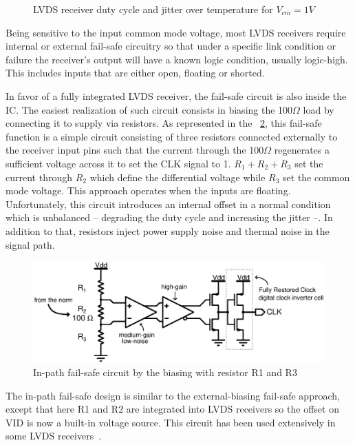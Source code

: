 \begin{figure}[htp]
\begin{subfigure}[b]{0.32\textwidth}
    \end{subfigure}
    \caption{LVDS receiver duty cycle and jitter over temperature for $V_{cm} = 1 V$}
    \label{fig:lvds-receiver-res1V}
\end{figure}

Being sensitive to the input common mode voltage, most LVDS receivers require internal or external fail-safe circuitry so that under a specific link condition or failure the receiver's output will have a known logic condition, usually logic-high. This includes inputs that are either open, floating or shorted.

In favor of a fully integrated LVDS receiver, the fail-safe circuit is also inside the IC\@. The easiest realization of such circuit consists in biasing the 100$\Omega$ load by connecting it to supply via resistors. As represented in the \figurename~\ref{fig:in-path-fail-safe}, this fail-safe function is a simple circuit consisting of three resistors connected externally to the receiver input pins such that the current through the 100$\Omega$ regenerates a sufficient voltage across it to set the CLK signal to 1. $R_1+R_2+R_3$ set the current through $R_2$ which define the differential voltage while $R_3$ set the common mode voltage. This approach operates when the inputs are floating. Unfortunately, this circuit introduces an internal offset in a normal condition which is unbalanced -- degrading the duty cycle and increasing the jitter --. In addition to that, resistors inject power supply noise and thermal noise in the signal path.

\begin{figure}[htp]
    \centering
    \includegraphics[width=\textwidth]{Chapter5/Figs/adc_chip/lvds-external-failsafe.ps}
    \caption{In-path fail-safe circuit by the biasing with resistor R1 and R3}
    \label{fig:in-path-fail-safe}
\end{figure}


The in-path fail-safe design is similar to the external-biasing fail-safe approach, except that here R1 and R2 are integrated into LVDS receivers so the offset on VID is now a built-in voltage source. This circuit has been used extensively in some LVDS receivers~\cite{TI-SLLA082B}.

